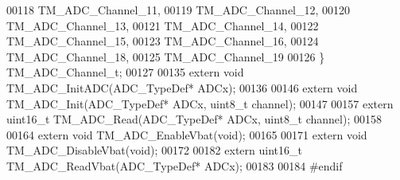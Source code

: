 \begin{DoxyCode}
00118     TM\_ADC\_Channel\_11,
00119     TM\_ADC\_Channel\_12,
00120     TM\_ADC\_Channel\_13,
00121     TM\_ADC\_Channel\_14,
00122     TM\_ADC\_Channel\_15,
00123     TM\_ADC\_Channel\_16,
00124     TM\_ADC\_Channel\_18,
00125     TM\_ADC\_Channel\_19
00126 \} TM\_ADC\_Channel\_t;
00127 
00135 \textcolor{keyword}{extern} \textcolor{keywordtype}{void} TM\_ADC\_InitADC(ADC\_TypeDef* ADCx);
00136 
00146 \textcolor{keyword}{extern} \textcolor{keywordtype}{void} TM\_ADC\_Init(ADC\_TypeDef* ADCx, uint8\_t channel);
00147 
00157 \textcolor{keyword}{extern} uint16\_t TM\_ADC\_Read(ADC\_TypeDef* ADCx, uint8\_t channel);
00158 
00164 \textcolor{keyword}{extern} \textcolor{keywordtype}{void} TM\_ADC\_EnableVbat(\textcolor{keywordtype}{void});
00165 
00171 \textcolor{keyword}{extern} \textcolor{keywordtype}{void} TM\_ADC\_DisableVbat(\textcolor{keywordtype}{void});
00172 
00182 \textcolor{keyword}{extern} uint16\_t TM\_ADC\_ReadVbat(ADC\_TypeDef* ADCx);
00183 
00184 \textcolor{preprocessor}{#endif}
\end{DoxyCode}

